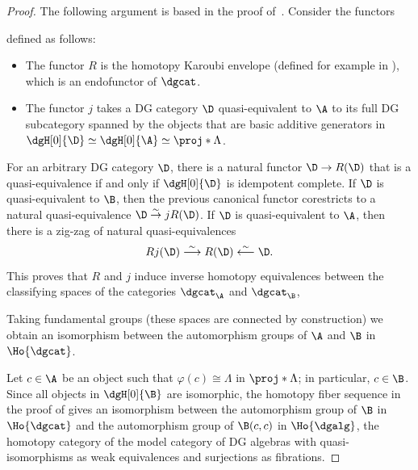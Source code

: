 \documentclass[a4paper]{amsart}
\begin{document}
\begin{proof}
  The following argument is based in the proof of~\cite[Prop.~8.5]{Mur22}.
  Consider the functors
  \begin{center}
  \end{center}
  defined as follows:
  \begin{itemize}
  \item The functor $R$ is the homotopy Karoubi envelope (defined for example in
    \cite[Sec.~4]{GHW21}), which is an endofunctor of $\dgcat$.
  \item The functor $j$ takes a DG category $\D$ quasi-equivalent to $\A$ to
    its full DG subcategory spanned by the objects that are basic additive
    generators in $\dgH[0]{\D}\simeq \dgH[0]{\A}\simeq\proj*{\Lambda}$.
  \end{itemize}
   For an arbitrary DG category $\D$, there is a natural functor $\D\to R(\D)$
   that is a quasi-equivalence if and only if $\dgH[0]{\D}$ is idempotent
   complete. If $\D$ is quasi-equivalent to $\B$, then the previous canonical
   functor corestricts to a natural quasi-equivalence $\D\stackrel{\sim}{\to} jR(\D)$.
   If $\D$ is quasi-equivalent to $\A$, then there is a zig-zag of natural quasi-equivalences
   \[
     Rj(\D)\stackrel{\sim}{\longrightarrow}R(\D)\stackrel{\sim}{\longleftarrow}\D.
   \]
  This proves that $R$ and $j$ induce inverse homotopy equivalences between the
  classifying spaces of the categories $\dgcat_\A$ and $\dgcat_\B$,
  \begin{center}
  \end{center}
  Taking fundamental groups (these spaces are connected by construction) we obtain an
  isomorphism between the automorphism groups of $\A$ and $\B$ in $\Ho{\dgcat}$.
  
  Let $c\in\A$ be an object such that $\varphi(c)\cong\Lambda$ in
  $\proj*{\Lambda}$; in particular, $c\in\B$. Since all objects in
  $\dgH[0]{\B}$ are isomorphic, the homotopy fiber sequence in the proof of
  \cite[Prop.~2.3.3.5]{TV08} gives an isomorphism between the automorphism group
  of $\B$ in $\Ho{\dgcat}$ and the automorphism group of $\B(c,c)$ in
  $\Ho{\dgalg}$, the homotopy category of the model category of DG algebras with
  quasi-isomorphisms as weak equivalences and surjections as fibrations.
  

\end{proof}
\end{document}
